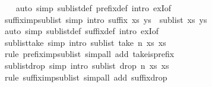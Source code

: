 \begin{isabellebody}
%
\isadelimproof
\ \ %
\endisadelimproof
%
\isatagproof
{}\isamarkupfalse%
\ {\isacharparenleft}auto\ simp{\isacharcolon}\ sublist{\isacharunderscore}def\ prefix{\isacharunderscore}def\ intro{\isacharcolon}\ exI{\isacharbrackleft}of\ {\isacharunderscore}\ {\isachardoublequoteopen}{\isacharbrackleft}{\isacharbrackright}{\isachardoublequoteclose}{\isacharbrackright}{\isacharparenright}%
\endisatagproof
{\isafoldproof}%
%
\isadelimproof
\isanewline
%
\endisadelimproof
\ \ \ \ \isanewline
{}\isamarkupfalse%
\ suffix{\isacharunderscore}imp{\isacharunderscore}sublist\ {\isacharbrackleft}simp{\isacharcomma}\ intro{\isacharbrackright}{\isacharcolon}\ {\isachardoublequoteopen}suffix\ xs\ ys\ {\isasymLongrightarrow}\ sublist\ xs\ ys{\isachardoublequoteclose}\isanewline
%
\isadelimproof
\ \ %
\endisadelimproof
%
\isatagproof
{}\isamarkupfalse%
\ {\isacharparenleft}auto\ simp{\isacharcolon}\ sublist{\isacharunderscore}def\ suffix{\isacharunderscore}def\ intro{\isacharcolon}\ exI{\isacharbrackleft}of\ {\isacharunderscore}\ {\isachardoublequoteopen}{\isacharbrackleft}{\isacharbrackright}{\isachardoublequoteclose}{\isacharbrackright}{\isacharparenright}%
\endisatagproof
{\isafoldproof}%
%
\isadelimproof
\isanewline
%
\endisadelimproof
\isanewline
{}\isamarkupfalse%
\ sublist{\isacharunderscore}take\ {\isacharbrackleft}simp{\isacharcomma}\ intro{\isacharbrackright}{\isacharcolon}\ {\isachardoublequoteopen}sublist\ {\isacharparenleft}take\ n\ xs{\isacharparenright}\ xs{\isachardoublequoteclose}\isanewline
%
\isadelimproof
\ \ %
\endisadelimproof
%
\isatagproof
{}\isamarkupfalse%
\ {\isacharparenleft}rule\ prefix{\isacharunderscore}imp{\isacharunderscore}sublist{\isacharparenright}\ {\isacharparenleft}simp{\isacharunderscore}all\ add{\isacharcolon}\ take{\isacharunderscore}is{\isacharunderscore}prefix{\isacharparenright}%
\endisatagproof
{\isafoldproof}%
%
\isadelimproof
\isanewline
%
\endisadelimproof
\isanewline
{}\isamarkupfalse%
\ sublist{\isacharunderscore}drop\ {\isacharbrackleft}simp{\isacharcomma}\ intro{\isacharbrackright}{\isacharcolon}\ {\isachardoublequoteopen}sublist\ {\isacharparenleft}drop\ n\ xs{\isacharparenright}\ xs{\isachardoublequoteclose}\isanewline
%
\isadelimproof
\ \ %
\endisadelimproof
%
\isatagproof
{}\isamarkupfalse%
\ {\isacharparenleft}rule\ suffix{\isacharunderscore}imp{\isacharunderscore}sublist{\isacharparenright}\ {\isacharparenleft}simp{\isacharunderscore}all\ add{\isacharcolon}\ suffix{\isacharunderscore}drop{\isacharparenright}%
\endisatagproof

\end{isabellebody}
